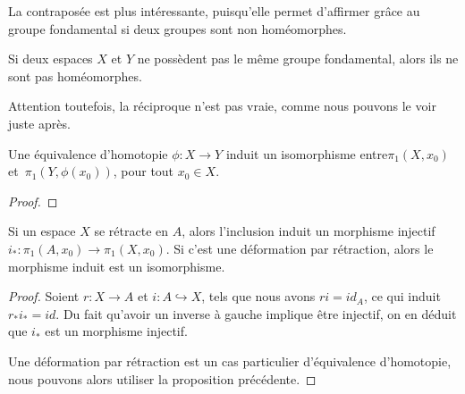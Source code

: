 La contraposée est plus intéressante, puisqu'elle permet d'affirmer grâce au groupe fondamental si deux groupes sont non homéomorphes.

\begin{corollary}
Si deux espaces $X$ et $Y$ ne possèdent pas le même groupe fondamental, alors ils ne sont pas homéomorphes.
\end{corollary}
\begin{remark}
Attention toutefois, la réciproque n'est pas vraie, comme nous pouvons le voir juste après.
\end{remark}

\begin{proposition}\label{prop:eq-homo-same-gr-fund}
Une équivalence d'homotopie $\phi:X\to Y$ induit un isomorphisme  entre$\pi_1(X,x_0)$ et~$\pi_1(Y,\phi(x_0))$, pour tout $x_0\in X$.
\end{proposition}
\begin{proof}

\end{proof}

\begin{proposition}
Si un espace $X$ se rétracte en $A$, alors l'inclusion induit un morphisme injectif~$i_\ast:\pi_1(A,x_0)\to\pi_1(X,x_0)$. Si c'est une déformation par rétraction, alors le morphisme induit est un isomorphisme.
\end{proposition}
\begin{proof}
Soient $r:X\to A$ et $i:A\hookrightarrow X$, tels que nous avons $ri=id_A$, ce qui induit~$r_\ast i_\ast=id$. Du fait qu'avoir un inverse à gauche implique être injectif, on en déduit que $i_\ast$ est un morphisme injectif.

Une déformation par rétraction est un cas particulier d'équivalence d'homotopie, nous pouvons alors utiliser la proposition précédente.
\end{proof}

